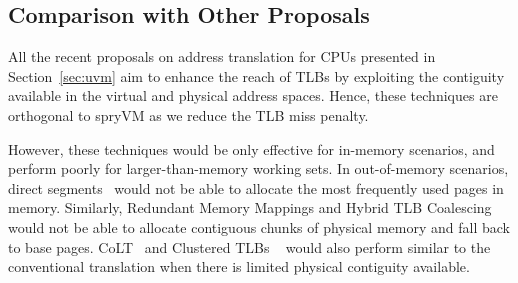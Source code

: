\subsection{Comparison with Other Proposals}

All the recent proposals on address translation for CPUs presented in Section~\ref{sec:uvm} aim to enhance the reach of TLBs by exploiting the contiguity available in the virtual and physical address spaces. Hence, these techniques are orthogonal to spryVM as we reduce the TLB miss penalty. 

However, these techniques would be only effective for in-memory scenarios, and perform poorly for larger-than-memory working sets. In out-of-memory scenarios, direct segments~\cite{basu:efficient} would not be able to allocate the most frequently used pages in memory. Similarly, Redundant Memory Mappings and Hybrid TLB Coalescing~\cite{karakostas:redundant, park:hybrid} would not be able to allocate contiguous chunks of physical memory and fall back to base pages. CoLT~\cite{pham:colt} and Clustered TLBs ~\cite{pham:increasing} would also perform similar to the conventional translation when there is limited physical contiguity available. 
